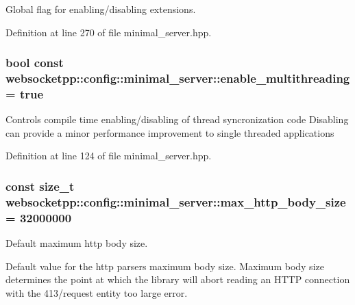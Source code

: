 Global flag for enabling/disabling extensions. 



Definition at line 270 of file minimal\+\_\+server.\+hpp.

\hypertarget{structwebsocketpp_1_1config_1_1minimal__server_a671a693af60cb11d9526d58aedce515c}{}
\subsubsection[{enable\+\_\+multithreading}]{\setlength{\rightskip}{0pt plus 5cm}bool const websocketpp\+::config\+::minimal\+\_\+server\+::enable\+\_\+multithreading = true\hspace{0.3cm}{\ttfamily [static]}}\label{structwebsocketpp_1_1config_1_1minimal__server_a671a693af60cb11d9526d58aedce515c}
Controls compile time enabling/disabling of thread syncronization code Disabling can provide a minor performance improvement to single threaded applications 

Definition at line 124 of file minimal\+\_\+server.\+hpp.

\hypertarget{structwebsocketpp_1_1config_1_1minimal__server_a56756239e0904949156e630c1f48d95e}{}
\subsubsection[{max\+\_\+http\+\_\+body\+\_\+size}]{\setlength{\rightskip}{0pt plus 5cm}const size\+\_\+t websocketpp\+::config\+::minimal\+\_\+server\+::max\+\_\+http\+\_\+body\+\_\+size = 32000000\hspace{0.3cm}{\ttfamily [static]}}\label{structwebsocketpp_1_1config_1_1minimal__server_a56756239e0904949156e630c1f48d95e}


Default maximum http body size. 

Default value for the http parser\textquotesingle{}s maximum body size. Maximum body size determines the point at which the library will abort reading an H\+T\+T\+P connection with the 413/request entity too large error.

